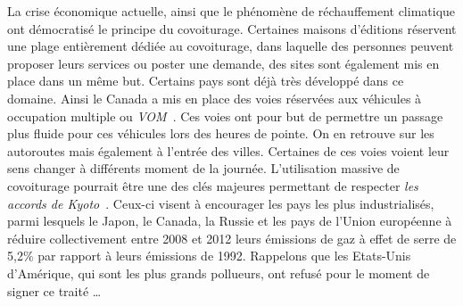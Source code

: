 \documentclass[12pt, a4paper, oneside]{article}
\begin{document}
    \indent La crise économique actuelle, ainsi que le phénomène de réchauffement climatique ont démocratisé le principe du covoiturage. Certaines maisons d'éditions réservent une plage entièrement dédiée au covoiturage, dans laquelle des personnes peuvent proposer leurs services ou poster une demande, des sites sont également mis en place dans un même but. Certains pays sont déjà très développé dans ce domaine. Ainsi le Canada a mis en place des voies réservées aux véhicules à occupation multiple ou \textit{VOM}~\cite{article-VOM}. Ces voies ont pour but de permettre un passage plus fluide pour ces véhicules lors des heures de pointe. On en retrouve sur les autoroutes mais également à l'entrée des villes. Certaines de ces voies voient leur sens changer à différents moment de la journée. L'utilisation massive de covoiturage pourrait être une des clés majeures permettant de respecter \textit{les accords de Kyoto}~\cite{article-Kyoto}. Ceux-ci visent à encourager les pays les plus industrialisés, parmi lesquels le Japon, le Canada, la Russie et les pays de l'Union européenne à réduire collectivement entre 2008 et 2012 leurs émissions de gaz à effet de serre de 5,2$\%$ par rapport à leurs émissions de 1992. Rappelons que les Etats-Unis d'Amérique, qui sont les plus grands pollueurs, ont refusé pour le moment de signer ce traité \dots
    
\end{document}
